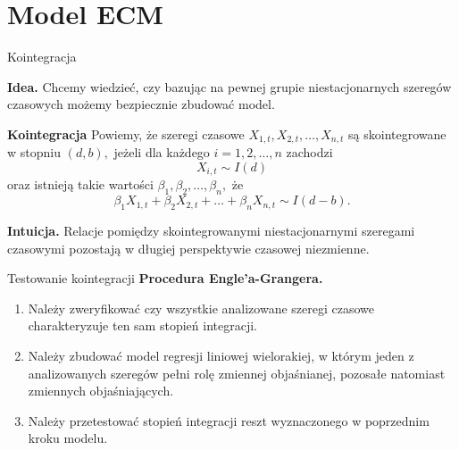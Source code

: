 \documentclass[a4paper, 11pt]{beamer}
\begin{document}
	\section{Model ECM}
	
	\begin{frame}{Kointegracja}
		\begin{alert}{\textbf{Idea.}}
			Chcemy wiedzieć, czy bazując na pewnej grupie niestacjonarnych 
			szeregów czasowych możemy bezpiecznie zbudować model.
		\end{alert}
		\begin{block}{\textbf{Kointegracja}}
			Powiemy, że szeregi czasowe $X_{1,t}, X_{2,t}, \ldots, X_{n,t}$ są skointegrowane w stopniu $\left(d,b\right),$ jeżeli dla każdego $i=1,2,\ldots,n$ zachodzi \[
				X_{i,t} \sim I\left(d\right)
			\] oraz istnieją takie wartości $\beta_1,\beta_2,\ldots,\beta_n,$ że \[
				\beta_1 X_{1,t} + \beta_2 X_{2,t} + \ldots + \beta_n X_{n,t} \sim I\left(d - b\right).
			\]
		\end{block}
		\begin{alert}{\textbf{Intuicja.}}
			Relacje pomiędzy skointegrowanymi niestacjonarnymi szeregami 
			czasowymi pozostają w długiej perspektywie czasowej niezmienne.
		\end{alert}
	\end{frame}
	
	\begin{frame}{Testowanie kointegracji}
		\textbf{Procedura Engle'a-Grangera.}
		\begin{enumerate}
			\item Należy zweryfikować czy wszystkie analizowane szeregi czasowe 
				charakteryzuje ten sam stopień integracji.
			\item Należy zbudować model regresji liniowej wielorakiej, w którym 
				jeden z analizowanych szeregów pełni rolę zmiennej objaśnianej, 
				pozosałe natomiast zmiennych objaśniających.
			\item Należy przetestować stopień integracji reszt wyznaczonego w 
				poprzednim kroku modelu.
		\end{enumerate}
	\end{frame}
	
\end{document}

